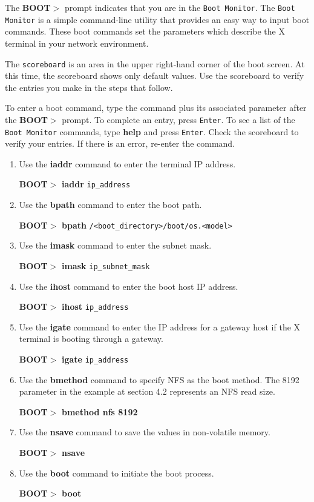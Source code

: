 The {\bf BOOT$>$} prompt indicates that you are in the {\tt Boot Monitor}. The
{\tt Boot Monitor} is a simple command-line utility that provides an easy way
to input boot commands. These boot commands set the parameters which describe
the X terminal in your network environment.

The {\tt scoreboard} is an area in the upper right-hand corner of the boot
screen. At this time, the scoreboard shows only default values. Use the
scoreboard to verify the entries you make in the steps that follow.

To enter a boot command, type the command plus its associated parameter after
the {\bf BOOT$>$} prompt. To complete an entry, press {\tt Enter}. To see a list
of the {\tt Boot Monitor} commands, type {\bf help} and press {\tt Enter}. Check
the scoreboard to verify your entries. If there is an error, re-enter the
command.

\begin {enumerate}

\item Use the {\bf iaddr} command to enter the terminal IP address.

{\bf BOOT$>$} {\bf iaddr} {\tt ip\_address}

\item Use the {\bf bpath} command to enter the boot path.

{\bf BOOT$>$} {\bf bpath} {\tt /<boot\_directory>/boot/os.<model>}

\item Use the {\bf imask} command to enter the subnet mask.

{\bf BOOT$>$} {\bf imask} {\tt ip\_subnet\_mask}

\item Use the {\bf ihost} command to enter the boot host IP address.

{\bf BOOT$>$} {\bf ihost} {\tt ip\_address}

\item Use the {\bf igate} command to enter the IP address for a gateway host if
the X terminal is booting through a gateway.

{\bf BOOT$>$} {\bf igate} {\tt ip\_address}

\item Use the {\bf bmethod} command to specify NFS as the boot method. The 8192
parameter in the example at section 4.2 represents an NFS read size.

{\bf BOOT$>$} {\bf bmethod nfs 8192}

\item Use the {\bf nsave} command to save the values in non-volatile memory.

{\bf BOOT$>$} {\bf nsave}

\item Use the {\bf boot} command to initiate the boot process.

{\bf BOOT$>$} {\bf boot}

\end {enumerate}

